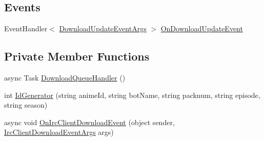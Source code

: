 \subsection*{Events}
\begin{DoxyCompactItemize}
\item 
Event\+Handler$<$ \mbox{\hyperlink{class_little_weeb_library_1_1_event_arguments_1_1_download_update_event_args}{Download\+Update\+Event\+Args}} $>$ \mbox{\hyperlink{class_little_weeb_library_1_1_handlers_1_1_download_handler_a639d0d2adc924c6252b3cc5756ea9281}{On\+Download\+Update\+Event}}
\end{DoxyCompactItemize}
\subsection*{Private Member Functions}
\begin{DoxyCompactItemize}
\item 
async Task \mbox{\hyperlink{class_little_weeb_library_1_1_handlers_1_1_download_handler_a2f646f8d28235a8953b67207ee6131d9}{Download\+Queue\+Handler}} ()
\item 
int \mbox{\hyperlink{class_little_weeb_library_1_1_handlers_1_1_download_handler_ad673ec5fc987996b4793c41ce77aaad4}{Id\+Generator}} (string anime\+Id, string bot\+Name, string packnum, string episode, string season)
\item 
async void \mbox{\hyperlink{class_little_weeb_library_1_1_handlers_1_1_download_handler_a8e40df55d254c0b95bb0a72becde5039}{On\+Irc\+Client\+Download\+Event}} (object sender, \mbox{\hyperlink{class_little_weeb_library_1_1_event_arguments_1_1_irc_client_download_event_args}{Irc\+Client\+Download\+Event\+Args}} args)
\end{DoxyCompactItemize}
